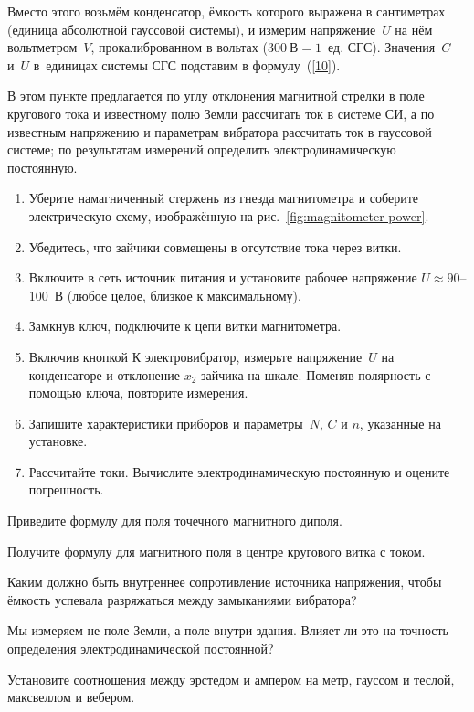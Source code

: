 Вместо этого возьмём конденсатор, ёмкость которого выражена в сантиметрах (единица абсолютной гауссовой системы), и
измерим напряжение~$U$ на нём вольтметром~$V$, прокалиброванном в вольтах ($300~В = 1$~ед. СГС). Значения~$C$ и~$U$
в~единицах системы СГС подставим в формулу~(\eqref{10}).

\begin{lab:task}

	В этом пункте предлагается по углу отклонения магнитной стрелки в поле кругового тока и известному полю Земли рассчитать
	ток в системе СИ, а по известным напряжению и параметрам вибратора рассчитать ток в гауссовой системе; по результатам
	измерений определить электродинамическую постоянную.
	
	\begin{enumerate}
		\item Уберите намагниченный стержень из гнезда магнитометра и соберите электрическую схему, изображённую на рис.~\ref{fig:magnitometer-power}.
		
		\item Убедитесь, что зайчики совмещены в отсутствие тока через витки.
		
		\item Включите в сеть источник питания и установите рабочее напряжение $U\approx 90$--100~В (любое целое, близкое к
		максимальному).
		
		\item Замкнув ключ, подключите к цепи витки магнитометра.
		
		\item Включив кнопкой К электровибратор, измерьте напряжение~$U$ на конденсаторе и отклонение $x_2$ зайчика на шкале.
		Поменяв полярность с помощью ключа, повторите измерения.
		
		\item Запишите характеристики приборов и параметры~$N$, $C$ и $n$, указанные на установке.
		
		\item Рассчитайте токи. Вычислите электродинамическую постоянную и оцените погрешность.
	\end{enumerate}


\end{lab:task}


\begin{lab:questions}
	\item Приведите формулу для поля точечного магнитного диполя.
	
	\item Получите формулу для магнитного поля в центре кругового витка с током.
	
	\item Каким должно быть внутреннее сопротивление источника напряжения, чтобы ёмкость успевала разряжаться между замыканиями
	вибратора?
	
	\item Мы измеряем не поле Земли, а поле внутри здания. Влияет ли это на точность определения электродинамической постоянной?
	
	\item Установите соотношения между эрстедом и ампером на метр, гауссом и теслой, максвеллом и вебером.
\end{lab:questions}

